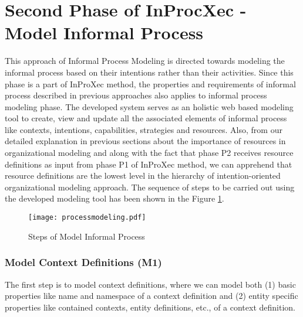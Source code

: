 \section{Second Phase of InProcXec - Model Informal Process}
\label{sec:informalprocessmodeling}
This approach of Informal Process Modeling is directed towards modeling the informal process based on their intentions rather than their activities.  Since this phase is a part of InProXec method, the properties and requirements of informal process described in previous approaches \cite{Sungur2014a,Sungur2015} also applies to informal process modeling phase. The developed system serves as an holistic web based modeling tool to create, view and update all the associated elements of informal process like contexts, intentions, capabilities, strategies and resources. Also, from our detailed explanation in previous sections about the importance of resources in organizational modeling and along with the fact that phase P2 receives resource definitions as input from phase P1 of InProXec method, we can apprehend that resource definitions are the lowest level in the hierarchy of intention-oriented organizational modeling approach. The sequence of steps to be carried out using the developed modeling tool has been shown in the Figure \ref{fig:processdiagram}. 

\begin{figure}
	\centering
	\texttt{[image: processmodeling.pdf]}
	\caption{Steps of Model Informal Process}
	\label{fig:processdiagram}
\end{figure}

\subsubsection{Model Context Definitions (M1)}  
The first step is to model context definitions, where we can model both (1) basic properties like name and namespace of a context definition and (2) entity specific properties like contained contexts, entity definitions, etc., of a context definition.  


